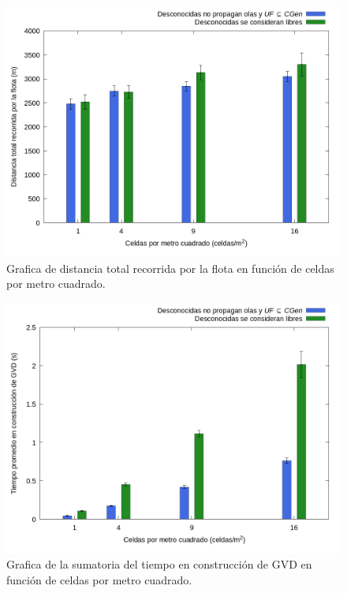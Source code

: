 \begin{figure}[H]
  \centerfloat

  \includegraphics[clip=true, width=\graphlen]{imagenes/graficas_chicas/graficas_histo_num/desconocido/exploration_cost.png}

  \caption{Grafica de distancia total recorrida por la flota en función de celdas por metro cuadrado.}\label{fig:gra:des:ec}

\end{figure}

\begin{figure}[H]
  \centerfloat

  \includegraphics[clip=true, width=\graphlen]{imagenes/graficas_chicas/graficas_histo_num/desconocido/gvd_construction_time_mean.png}

  \caption{Grafica de la sumatoria del tiempo en construcción de GVD en función de celdas por metro cuadrado.}\label{fig:gra:des:gvdt}

\end{figure}

